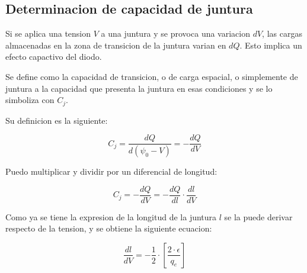 \documentclass[../main.tex]{subfiles}
\begin{document}
	
	\subsection{Determinacion de capacidad de juntura}
	
	Si se aplica una tension $V$ a una juntura y se provoca una variacion $dV$, las cargas almacenadas en la zona de transicion de la juntura varian en $dQ$.	
	Esto implica un efecto capactivo del diodo.
	
	Se define como la capacidad de transicion, o de carga espacial, o simplemente de juntura a la capacidad que presenta la juntura en esas condiciones y se lo simboliza con $C_j$.
	
	Su definicion es la siguiente:
	
	\begin{equation}
		C_j = \frac{dQ}{d(\psi_0 - V)} = - \frac{dQ}{dV}
	\end{equation}
	
	Puedo multiplicar y dividir por un diferencial de longitud:
	
	\begin{equation}
		C_j = - \frac{dQ}{dV} = - \frac{dQ}{dl} \cdot \frac{dl}{dV}
	\end{equation}
	
	Como ya se tiene la expresion de la longitud de la juntura $l$ se la puede derivar respecto de la tension, y se obtiene la siguiente ecuacion:
	
	\begin{equation}
		\frac{dl}{dV} = -\frac{1}{2} \cdot \left[ \frac{2 \cdot \epsilon}{q_e} \right]  
	\end{equation}
\end{document}
